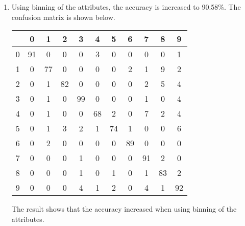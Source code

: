 \documentclass[11pt,letterpaper,oneside]{article}
\begin{document}
\begin{enumerate}
\item Using binning of the attributes, the accuracy is increased to 90.58\%. The confusion matrix is shown below.

  \begin{tabular}{c|cccccccccc}
     & 0 & 1 & 2 & 3 & 4 & 5 & 6 & 7 & 8 & 9\\ \hline
   0 & 91&  0&  0&  0&  3&  0&  0&  0&  0&  1\\
   1 & 0& 77&  0&  0&  0&  0&  2&  1&  9&  2\\
   2 & 0&  1& 82&  0&  0&  0&  0&  2&  5&  4\\
   3 & 0&  1&  0& 99&  0&  0&  0&  1&  0&  4\\
   4 & 0&  1&  0&  0& 68&  2&  0&  7&  2&  4\\
   5 & 0&  1&  3&  2&  1& 74&  1&  0&  0&  6\\
   6 & 0&  2&  0&  0&  0&  0& 89&  0&  0&  0\\
   7 & 0&  0&  0&  1&  0&  0&  0& 91&  2&  0\\
   8 & 0&  0&  0&  1&  0&  1&  0&  1& 83&  2\\
   9 & 0&  0&  0&  4&  1&  2&  0&  4&  1& 92\\
  \end{tabular}

The result shows that the accuracy increased when using binning of the attributes.
\end{enumerate}
\end{document}
